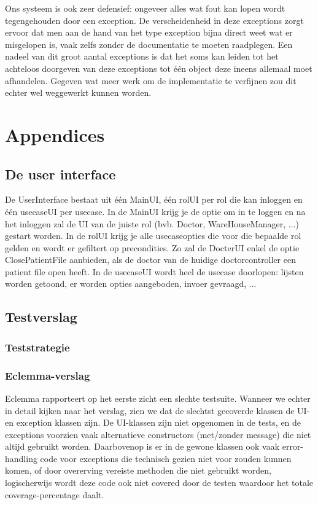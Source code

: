 \documentclass[a4paper]{article}
\begin{document}
Ons systeem is ook zeer defensief: ongeveer alles wat fout kan lopen wordt tegengehouden door een exception. De verscheidenheid in deze exceptions zorgt ervoor dat men aan de hand van het type exception bijna direct weet wat er misgelopen is, vaak zelfs zonder de documentatie te moeten raadplegen.
Een nadeel van dit groot aantal exceptions is dat het soms kan leiden tot het achteloos doorgeven van deze exceptions tot \'e\'en object deze ineens allemaal moet afhandelen. Gegeven wat meer werk om de implementatie te verfijnen zou dit echter wel weggewerkt kunnen worden.
\section{Appendices}
\subsection{De user interface \label{sec:ui}}
De UserInterface bestaat uit \'e\'en MainUI, \'e\'en rolUI per rol die kan inloggen en \'e\'en usecaseUI per usecase.
In de MainUI krijg je de optie om in te loggen en na het inloggen zal de UI van de juiste rol (bvb. Doctor, WareHouseManager, ...) gestart worden.
In de rolUI krijg je alle usecaseopties die voor die bepaalde rol gelden en wordt er gefiltert op precondities. Zo zal de DocterUI enkel de optie ClosePatientFile aanbieden, als de doctor van de huidige doctorcontroller een patient file open heeft.
In de usecaseUI wordt heel de usecase doorlopen: lijsten worden getoond, er worden opties aangeboden, invoer gevraagd, ...

\subsection{Testverslag}
\subsubsection{Teststrategie}

\subsubsection{Eclemma-verslag} %
Eclemma rapporteert op het eerste zicht een slechte testsuite. Wanneer we echter in detail kijken naar het verslag, zien we dat de slechtst gecoverde klassen de UI- en exception klassen zijn. De UI-klassen zijn niet opgenomen in de tests, en de exceptions voorzien vaak alternatieve constructors (met/zonder message) die niet altijd gebruikt worden. Daarbovenop is er in de gewone klassen ook vaak error-handling code voor exceptions die technisch gezien niet voor zouden kunnen komen, of door overerving vereiste methoden die niet gebruikt worden, logischerwijs wordt deze code ook niet covered door de testen waardoor het totale coverage-percentage daalt.
\end{document}

